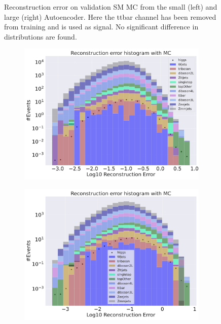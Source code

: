 \begin{figure}[h!]
\begin{subfigure}{.45\textwidth}
        \caption{ }
        \label{fig:ae_big_ttbar}
    \end{subfigure}
    \hfill 
    \caption[AE | Reconstruction error using ttbar channel as signal]{Reconstruction error on validation SM MC from the small (left) and large (right) Autoencoder. Here the ttbar channel has been removed from training and 
    is used as signal. No significant difference in distributions are found.  }
    \label{fig:ae_big_channel_3}
\end{figure}



\begin{figure}[h!]
    \centering
    \begin{subfigure}{.45\textwidth}
        \includegraphics[width=\textwidth]{Figures/VAE_testing/small/b_data_recon_big_rm3_feats_sig_higgs.pdf}
        \caption{}
        \label{fig:vae_small_higgs}
    \end{subfigure}
    \hfill 
    \begin{subfigure}{.45\textwidth}
        \includegraphics[width=\textwidth]{Figures/VAE_testing/big/b_data_recon_big_rm3_feats_sig_higgs.pdf}

\end{subfigure}
\end{figure}
